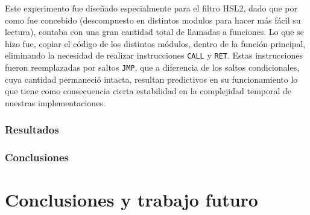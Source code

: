 \documentclass[a4paper]{article}
\begin{document}
Este experimento fue diseñado especialmente para el filtro HSL2, dado que por como fue concebido (descompuesto en distintos modulos para hacer más fácil su lectura), contaba con una gran cantidad total de llamadas a funciones. Lo que se hizo fue, copiar el código de los distintos módulos, dentro de la función principal, eliminando la necesidad de realizar instrucciones {\tt CALL} y {\tt RET}. Estas instrucciones fueron reemplazadas por saltos {\tt JMP}, que a diferencia de los saltos condicionales, cuya cantidad permaneció intacta, resultan predictivos en su funcionamiento lo que tiene como consecuencia cierta estabilidad en la complejidad temporal de nuestras implementaciones.

\subsubsection{Resultados}

\subsubsection{Conclusiones}


\newpage
\section{Conclusiones y trabajo futuro}
\end{document}
